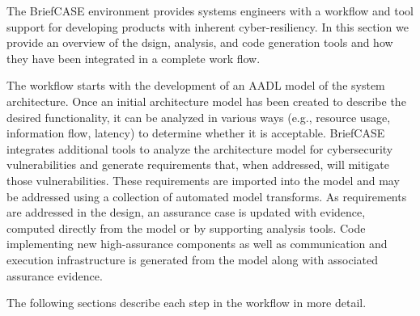 

The BriefCASE environment provides systems engineers with a workflow and tool support for developing
products with inherent cyber-resiliency. 
In this section we provide an overview of the dsign, analysis, and code generation tools and how they have been integrated in a complete work flow.  

The  workflow starts with the development of an AADL model of the system architecture. 
Once an initial architecture model has been created to describe the desired functionality, 
it can be analyzed in various ways (e.g., resource
usage, information flow, latency) to determine whether it is acceptable.
BriefCASE integrates additional tools to analyze the architecture model for cybersecurity vulnerabilities and
generate requirements that, when addressed, will mitigate those vulnerabilities.
These requirements are imported into the model and may be addressed using a 
collection of automated model transforms. As requirements are addressed in the design, an assurance case is updated with
evidence, computed directly from the model or by supporting analysis tools.  
Code implementing new high-assurance components as well as communication and execution infrastructure
is generated from the model along with associated assurance evidence.  

The following sections describe each step in the workflow in more detail. 

